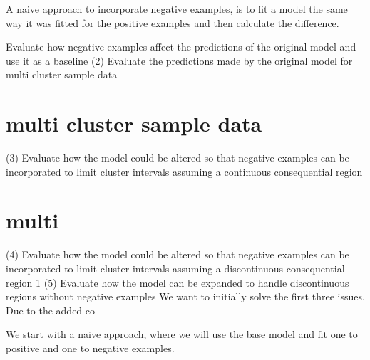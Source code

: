 \documentclass[12pt, ]{scrartcl}
\begin{document}
\begin{multicols}{2}
A naive approach to incorporate negative examples, is to fit a model the same way it was fitted for the positive examples and then  calculate the difference.

\noindent

Evaluate how negative examples affect the predictions of the original model and use it as a baseline
(2) Evaluate the predictions made by the original model for multi cluster sample data
\section{multi cluster sample data}
(3) Evaluate how the model could be altered so that negative examples can be incorporated to limit cluster intervals assuming a continuous consequential region
\section{multi}
(4) Evaluate how the model could be altered so that negative examples can be incorporated to limit cluster intervals assuming a discontinuous consequential region
1
(5) Evaluate how the model can be expanded to handle discontinuous regions without
negative examples
We want to initially solve the first three issues. Due to the added co

We start with a naive approach, where we will use the base model and fit one to positive and one to negative examples.

\centering

\nocite{*}
\printbibliography
\end{multicols}
\end{document}
